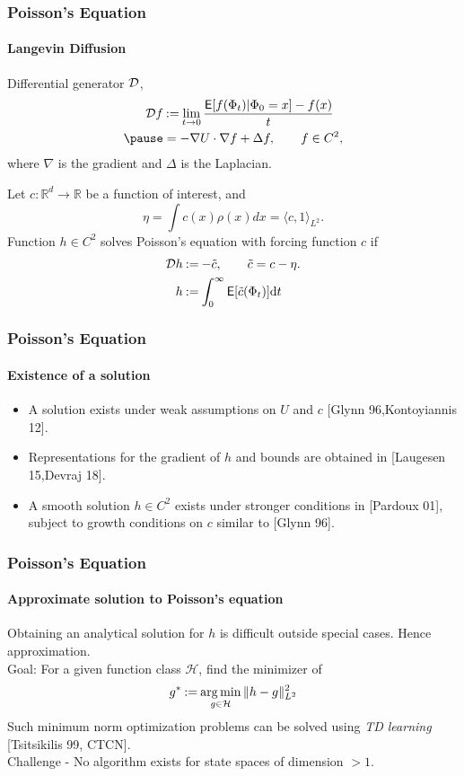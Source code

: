 \documentclass[xcolor=dvipsnames, subsection=false]{beamer}
\def\alertb#1{\alert{\color{BrickRed}  #1}}
\def\alertb#1{\alert{\color{BrickRed}  #1}}
\def\clH{{\mathcal H}}
\def\tilc{\tilde c}
\def\Expect{{\sf E}}
\newcommand{\field}[1]{\mathbb{#1}}
\def\Re{\field{R}}
\def\argmin{\mathop{\rm arg\, min}}
\def\eqdef{\mathbin{:=}}
\def\markovstate{\Phi}
\def\generate{{\cal D}}
\def\ud{\text{d}}
\newcommand{\pot}{U}
\newcommand{\pr}{\rho}
\def\Expect{{\sf E}}
\def\bl#1{{\color{blue}#1}}
\begin{document}
\begin{frame}
\frametitle{Poisson's Equation}
\framesubtitle{Langevin Diffusion}
\alertb{Differential generator} $\generate$,
\[
\begin{aligned}
 \generate f &\eqdef \lim_{t\to 0} \frac{\Expect [f(\Phi_t)| \Phi_0 = x] - f(x)}{t} \\ \pause
 & = -\nabla \pot \cdot \nabla f + \Delta f,\qquad f\in C^2,
\label{e:Lfish}
\end{aligned}
\]
where $\nabla$ is the gradient and $\Delta$ is the Laplacian. \pause

Let $c \colon \Re^d \to \Re$ be a function of interest, and
\[
\eta = \int c(x) \pr(x) dx = \langle c, 1 \rangle_{L^2}.
\] \pause
Function $h\in C^2$ solves \alertb{Poisson's equation} with forcing function $c$ if
\[
\begin{aligned}
\generate h &\eqdef - \tilc, \qquad  \tilc = c - \eta. \\
h & \eqdef \int_0^\infty \Expect [\tilc(\markovstate_t)] \ud t
\label{e:poissons}
\end{aligned}
\]
\end{frame}

\begin{frame}
\frametitle{Poisson's Equation}
\framesubtitle{Existence of a solution}
\begin{itemize}
\item A solution exists under weak assumptions on $\pot$ and $c$ \bl{\small{[Glynn 96,Kontoyiannis 12]}}.
\item Representations for the gradient of $h$ and bounds are obtained in \bl{\small{[Laugesen 15,Devraj 18]}}.
\item A smooth solution $h\in C^2$ exists under stronger conditions in \bl{\small{[Pardoux 01]}}, subject to growth conditions on $c$ similar to \bl{\small{[Glynn 96]}}.
\end{itemize}
\end{frame}

\begin{frame}
\frametitle{Poisson's Equation}
\framesubtitle{Approximate solution to Poisson's equation}
Obtaining an analytical solution for $h$ is difficult outside special cases. Hence approximation.\\[0.5cm] \pause
Goal: For a given function class $\clH$, find the minimizer of
\[
g^* \eqdef \argmin_{g \in \clH} \|h - g\|^2_{L^2}
\label{e:lstd1}
\]
Such minimum norm optimization problems can be solved using \textit{TD learning} \bl{\small{[Tsitsikilis 99, CTCN]}}.\\[0.5cm] \pause
\alertb{Challenge - No algorithm exists for state spaces of dimension $> 1$}.
\end{frame}
\end{document}
